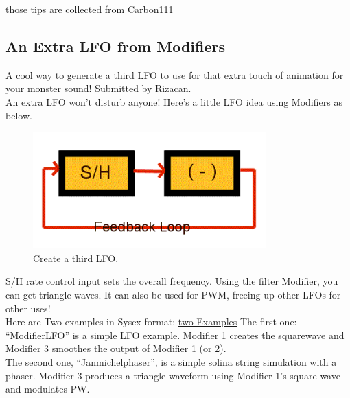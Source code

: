 those tips are collected from \href{https://www.carbon111.com/mwxt.html}{Carbon111}
\subsection{An Extra LFO from Modifiers}
A cool way to generate a third LFO to use for that extra touch of animation for your monster sound! Submitted by Rizacan.\\
An extra LFO won't disturb anyone! Here's a little LFO idea using Modifiers as below.
\bigskip %
%
\begin{figure}[ht!]
	\centering
	\includegraphics[width=90mm]{pics/lfo_feedback.png}
	\caption{Create a third LFO.}
	\label{third_lfo}
\end{figure}
S/H rate control input sets the overall frequency. Using the filter Modifier, you can get triangle waves. It can also be used for PWM, freeing up other LFOs for other uses!\\
Here are Two examples in Sysex format: \href{https://www.carbon111.com/sysex.zip}{two Examples}
The first one: ``ModifierLFO'' is a simple LFO example. Modifier 1 creates the squarewave and Modifier 3 smoothes the output of Modifier 1 (or 2).\\
The second one, ``Janmichelphaser'', is a simple solina string simulation with a phaser. Modifier 3 produces a triangle waveform using Modifier 1's square wave and modulates PW.
